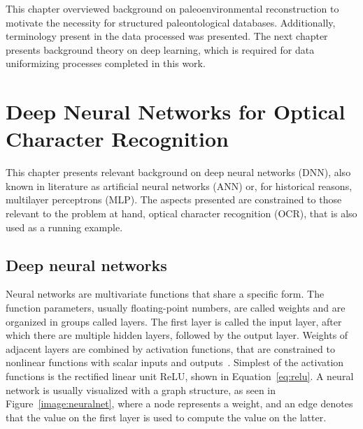 \documentclass[english,twoside,openright]{UH_DS_MSc}
\begin{document}
This chapter overviewed background on paleoenvironmental 
reconstruction to motivate the necessity for structured paleontological 
databases. Additionally, terminology present in the data processed was presented.
The next chapter presents background theory on deep learning, which is required for data 
uniformizing processes completed in this work.

\chapter{Deep Neural Networks for Optical Character Recognition}


This chapter presents relevant background on deep neural networks (DNN), also known 
in literature as artificial neural networks (ANN) or, for historical reasons, multilayer perceptrons (MLP).
The aspects presented are constrained to those relevant to the problem at hand, optical character recognition (OCR),
that is also used as a running example.

\section{Deep neural networks}


Neural networks are multivariate functions that share a specific form.
The function parameters, usually floating-point numbers, are called weights and are organized in groups called layers.
The first layer is called the input layer, after which there are multiple hidden layers, followed by the output layer.
Weights of adjacent layers are combined by activation functions, that are constrained to nonlinear functions with 
scalar inputs and outputs~\cite{princebook}. Simplest of the activation functions is the rectified
linear unit ReLU, shown in Equation~\ref{eq:relu}. A neural network is usually visualized with a graph structure, as seen in Figure~\ref{image:neuralnet}, where a node represents a 
weight, and an edge denotes that the value on the first layer is used to compute the value on the latter.
\end{document}
